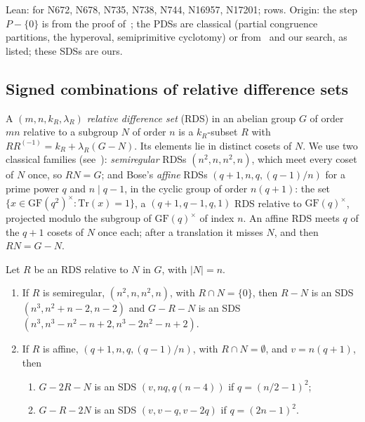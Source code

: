 \begin{remark}
Lean:  for N672, N678, N735, N738, N744, N16957, N17201;
 rows. Origin: the step $P - \{0\}$ is from the proof of~\cite[Thm.~5.3]{he-wu};
the PDSs are classical (partial congruence partitions, the hyperoval, semiprimitive
cyclotomy) or from~\cite{malandro-smith} and our search, as listed; these SDSs are ours.
\end{remark}

\subsection{Signed combinations of relative difference sets}

A $(m, n, k_R, \lambda_R)$ \emph{relative difference set} (RDS) in an abelian group $G$ of order
$mn$ relative to a subgroup $N$ of order $n$ is a $k_R$-subset $R$ with
$RR^{(-1)} = k_R + \lambda_R(G - N)$. Its elements lie in distinct cosets of $N$. We use two
classical families (see~\cite{pott}): \emph{semiregular} RDSs $(n^2, n, n^2, n)$, which meet
every coset of $N$ once, so $RN = G$; and Bose's \emph{affine} RDSs $(q+1, n, q, (q-1)/n)$ for a
prime power $q$ and $n \mid q - 1$, in the cyclic group of order $n(q+1)$: the set
$\{x \in \mathrm{GF}(q^2)^\times : \mathrm{Tr}(x) = 1\}$, a $(q+1, q-1, q, 1)$ RDS relative to
$\mathrm{GF}(q)^\times$, projected modulo the subgroup of $\mathrm{GF}(q)^\times$ of index $n$. An
affine RDS meets $q$ of the $q+1$ cosets of $N$ once each; after a translation it misses $N$,
and then $RN = G - N$.

\begin{proposition}\label{prop:rdscomb}
Let $R$ be an RDS relative to $N$ in $G$, with $|N| = n$.
\begin{enumerate}
\item If $R$ is semiregular, $(n^2, n, n^2, n)$, with $R \cap N = \{0\}$, then $R - N$ is an
  SDS $(n^3, n^2 + n - 2, n - 2)$ and $G - R - N$ is an SDS
  $(n^3, n^3 - n^2 - n + 2, n^3 - 2n^2 - n + 2)$.
\item If $R$ is affine, $(q+1, n, q, (q-1)/n)$, with $R \cap N = \emptyset$, and
  $v = n(q+1)$, then
  \begin{enumerate}
  \item $G - 2R - N$ is an SDS $(v, nq, q(n-4))$ if $q = (n/2 - 1)^2$;
  \item $G - R - 2N$ is an SDS $(v, v - q, v - 2q)$ if $q = (2n - 1)^2$.
  \end{enumerate}
\end{enumerate}
\end{proposition}

